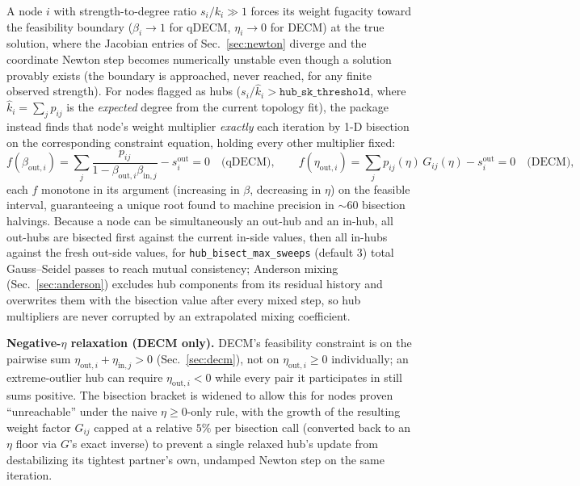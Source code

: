 \documentclass[10pt]{article}
\begin{document}
A node $i$ with strength-to-degree ratio $s_i/k_i\gg1$ forces its weight
fugacity toward the feasibility boundary ($\beta_i\to1$ for qDECM,
$\eta_i\to0$ for DECM) at the true solution, where the Jacobian entries of
Sec.~\ref{sec:newton} diverge and the coordinate Newton step becomes
numerically unstable even though a solution provably exists (the boundary
is approached, never reached, for any finite observed strength). For nodes
flagged as hubs ($s_i/\hat k_i > \texttt{hub\_sk\_threshold}$, where
$\hat k_i=\sum_j p_{ij}$ is the \emph{expected} degree from the current
topology fit), the package instead finds that node's weight multiplier
\emph{exactly} each iteration by 1-D bisection on the corresponding
constraint equation, holding every other multiplier fixed:
\begin{equation}
f(\beta_{\mathrm{out},i}) = \sum_{j} \frac{p_{ij}}{1-\beta_{\mathrm{out},i}\beta_{\mathrm{in},j}} - s^{\mathrm{out}}_i = 0 \quad\text{(qDECM)}, \qquad
f(\eta_{\mathrm{out},i}) = \sum_j p_{ij}(\eta)\,G_{ij}(\eta) - s^{\mathrm{out}}_i = 0 \quad\text{(DECM)},
\end{equation}
each $f$ monotone in its argument (increasing in $\beta$, decreasing in
$\eta$) on the feasible interval, guaranteeing a unique root found to
machine precision in $\sim60$ bisection halvings. Because a node can be
simultaneously an out-hub and an in-hub, all out-hubs are bisected first
against the current in-side values, then all in-hubs against the fresh
out-side values, for \texttt{hub\_bisect\_max\_sweeps} (default 3) total
Gauss--Seidel passes to reach mutual consistency; Anderson mixing
(Sec.~\ref{sec:anderson}) excludes hub components from its residual history
and overwrites them with the bisection value after every mixed step, so
hub multipliers are never corrupted by an extrapolated mixing coefficient.

\textbf{Negative-$\eta$ relaxation (DECM only).} DECM's feasibility
constraint is on the pairwise sum $\eta_{\mathrm{out},i}+\eta_{\mathrm{in},j}>0$
(Sec.~\ref{sec:decm}), not on $\eta_{\mathrm{out},i}\ge0$ individually; an
extreme-outlier hub can require $\eta_{\mathrm{out},i}<0$ while every pair
it participates in still sums positive. The bisection bracket is widened
to allow this for nodes proven ``unreachable'' under the naive
$\eta\ge0$-only rule, with the growth of the resulting weight factor
$G_{ij}$ capped at a relative $5\%$ per bisection call (converted back to
an $\eta$ floor via $G$'s exact inverse) to prevent a single relaxed
hub's update from destabilizing its tightest partner's own, undamped
Newton step on the same iteration.
\end{document}
